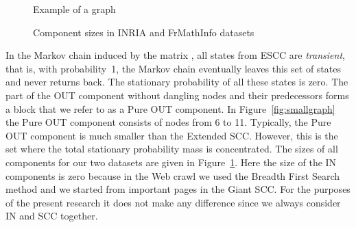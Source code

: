 \documentclass{article}
\begin{document}
\begin{figure}[h]
  \begin{minipage}{0.4\textwidth}
    \begin{center}
        \caption{Example of a graph}
        \label{fig:smallgraph}
    \end{center}
  \end{minipage}
\nolinebreak
  \begin{minipage}{0.4\textwidth}
    \begin{center}
 \caption{Component sizes in INRIA and FrMathInfo
datasets} \label{tab:sizes}
    \end{center}
  \end{minipage}
\end{figure}


In the Markov chain induced by the matrix , all states from ESCC
are {\it transient}, that is, with probability~1, the Markov chain
eventually leaves this set of states and never returns back. The
stationary probability of all these states is zero. The part of the
OUT component without dangling nodes and their predecessors forms a
block that we refer to as a Pure OUT component. In
Figure~\ref{fig:smallgraph} the Pure OUT component consists of nodes
from 6 to 11. Typically, the Pure OUT component is much smaller than
the Extended SCC. However, this is the set where the total
stationary probability mass is concentrated. The sizes of all
components for our two datasets are given in Figure~\ref{tab:sizes}.
Here the size of the IN components is zero because in the Web
crawl we used the Breadth First Search method and we started from
important pages in the Giant SCC. For the purposes of the
present research it does not make any difference since we always
consider IN and SCC together.
\end{document}
